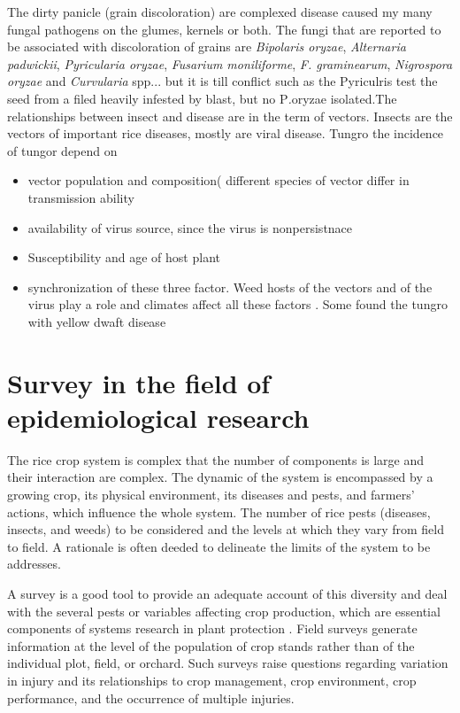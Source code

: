 The dirty panicle (grain discoloration) are complexed disease caused my many fungal pathogens on the glumes, kernels or both. The fungi that are reported to be associated with discoloration of grains are \textit{Bipolaris oryzae}, \textit{Alternaria padwickii}, \textit{Pyricularia oryzae}, \textit{Fusarium moniliforme}, \textit{F. graminearum}, \textit{Nigrospora oryzae} and \textit{Curvularia} spp..\cite{ouricedisease}. but it is till conflict such as the Pyriculris test the seed from a filed heavily infested by blast, but no P\textit.{oryzae} isolated.The relationships between insect and disease are in the term of vectors. Insects are the vectors of important rice diseases, mostly are viral disease. Tungro the incidence of tungor depend on 
\begin{itemize}
\item vector population and composition( different species of vector differ in transmission ability 
\item availability of virus source, since the virus is nonpersistnace
\item Susceptibility and age of host plant 
\item synchronization of these three factor. 
Weed hosts of the vectors and of the virus play a role and climates affect all these factors \cite{naganagoud2010studies}. Some found the tungro with yellow dwaft disease \cite{ouricedisease}
\end{itemize}

\section*{Survey in the field of epidemiological research}
The rice crop system is complex that the number of components is large and their interaction are complex. The dynamic of the system is encompassed by a growing crop, its physical environment, its diseases and pests, and farmers' actions, which influence the whole system. The number of rice pests (diseases, insects, and weeds) to be considered and the levels at which they vary from field to field. A rationale is often deeded to delineate the limits of the system to be addresses.

A survey is a good tool to provide an adequate account of this diversity and deal with the several pests or variables affecting crop production, which are essential components of systems research in plant protection \citet{Zadoks:1979ts}. Field surveys generate information at the level of the population of crop stands rather than of the individual plot, field, or orchard. Such surveys raise questions regarding variation in injury and its relationships to crop management, crop environment, crop performance, and the occurrence of multiple injuries.

